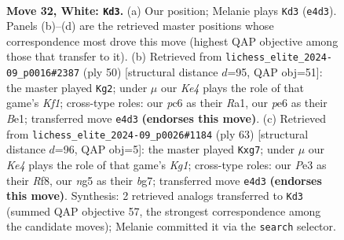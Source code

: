 \documentclass[11pt]{article}
\begin{document}
\clearpage

\begin{figure}[p]\centering
\begin{subfigure}{0.46\textwidth}\centering
\resizebox{\linewidth}{!}{%
\newchessgame
\chessboard[
  setfen={r6r/4k2p/1pp1p1p1/6n1/1p1PK2P/PP2P1b1/R5q1/2BQ4 w - - 1 32},
  showmover=false,
  pgfstyle=straightmove, color=movearrow, markmove={e4-d3}
]}
\caption{}
\end{subfigure}\hfill
\begin{subfigure}{0.46\textwidth}\centering
\resizebox{\linewidth}{!}{%
\newchessgame
\chessboard[
  setfen={r6r/p4k2/q1pbp1p1/8/3Pp2P/1p2P2Q/P4P2/R3BK1R w - - 0 26},
  showmover=false,
  pgfstyle=straightmove, color=movearrow, markmove={f1-g2}
]}
\caption{}
\end{subfigure}
\\[4pt]
\begin{subfigure}{0.46\textwidth}\centering
\resizebox{\linewidth}{!}{%
\newchessgame
\chessboard[
  setfen={5rk1/6Bp/1p2q3/2pN3p/2P1p3/1Q2RbP1/5P1P/6K1 b - - 0 32},
  showmover=false,
  pgfstyle=straightmove, color=movearrow, markmove={g8-g7}
]}
\caption{}
\end{subfigure}\hfill

\caption{\textbf{Move 32, White: \texttt{Kd3}.} (a) Our position; Melanie plays \texttt{Kd3} (\texttt{e4d3}). Panels (b)--(d) are the retrieved master positions whose correspondence most drove this move (highest QAP objective among those that transfer to it). (b) Retrieved from \texttt{lichess\_elite\_2024-09\_p0016\#2387} (ply 50) [structural distance $d$=95, QAP obj=51]: the master played \texttt{Kg2}; under $\mu$ our \emph{Ke4} plays the role of that game's \emph{Kf1}; cross-type roles: our \emph{p}c6 as their \emph{R}a1, our \emph{p}e6 as their \emph{B}e1; transferred move \texttt{e4d3} \textbf{(endorses this move)}. (c) Retrieved from \texttt{lichess\_elite\_2024-09\_p0026\#1184} (ply 63) [structural distance $d$=96, QAP obj=5]: the master played \texttt{Kxg7}; under $\mu$ our \emph{Ke4} plays the role of that game's \emph{Kg1}; cross-type roles: our \emph{P}e3 as their \emph{R}f8, our \emph{n}g5 as their \emph{b}g7; transferred move \texttt{e4d3} \textbf{(endorses this move)}. Synthesis: 2 retrieved analogs transferred to \texttt{Kd3} (summed QAP objective 57, the strongest correspondence among the candidate moves); Melanie committed it via the \texttt{search} selector.}
\label{fig:thought-m62}
\end{figure}
\end{document}
